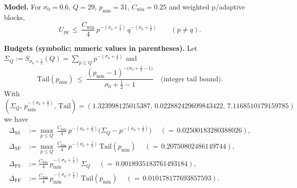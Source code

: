 \begingroup
\def\sigmao{0.6}
\def\Q{29}
\def\pmin{31}
\def\Cwin{0.25}

\def\SsigzeroQ{2.9593220929397814}          %
\def\SsigQ{1.323998125015387}               %
\def\pminpow{0.022882429699843422}          %
\def\TailInt{7.1168510179159785}            %

\def\Lofpmin{0.17500145020235344}           %
\def\mufar{0.9708330916329411}              %

\def\musmall{0.959149}                      %

\noindent\textbf{Model.}\quad
For $\sigma_0=\sigmao$, $Q=\Q$, $p_{\min}=\pmin$, $C_{\mathrm{win}}=\Cwin$ and weighted p\-/adaptive blocks,
\[
U_{pq}\ \le\ \frac{C_{\mathrm{win}}}{4}\,p^{-(\sigma_0+\tfrac12)}\,q^{-(\sigma_0+\tfrac12)}\qquad(p\neq q).
\]

\medskip
\noindent\textbf{Budgets (symbolic; numeric values in parentheses).}
Let $\Sigma_Q:=S_{\sigma_0+\frac12}(Q)=\sum_{p\le Q}p^{-(\sigma_0+\frac12)}$ and
\[
\mathrm{Tail}(p_{\min})
\ \le\
\frac{(p_{\min}-1)^{-\big(\sigma_0+\frac12-1\big)}}{\sigma_0+\frac12-1}
\quad\text{(integer tail bound)}.
\]
With $(\Sigma_Q,\,p_{\min}^{-(\sigma_0+\frac12)},\,\mathrm{Tail})=(\SsigQ,\,\pminpow,\,\TailInt)$ we have
\[
\begin{aligned}
\Delta_{\mathrm{SS}}
&:= \max_{p\le Q}\ \frac{C_{\mathrm{win}}}{4}\,p^{-(\sigma_0+\tfrac12)}
\Big(\Sigma_Q - p^{-(\sigma_0+\tfrac12)}\Big)
\quad\ (=\,\mathbf{0.02500183280388026}),\\[2pt]
\Delta_{\mathrm{SF}}
&:= \max_{p\le Q}\ \frac{C_{\mathrm{win}}}{4}\,p^{-(\sigma_0+\tfrac12)}\,
\mathrm{Tail}(p_{\min})
\quad\ (=\,\mathbf{0.20750802486149744}),\\[2pt]
\Delta_{\mathrm{FS}}
&:= \frac{C_{\mathrm{win}}}{4}\,p_{\min}^{-(\sigma_0+\tfrac12)}\,\Sigma_Q
\quad\ (=\,\mathbf{0.0018935183761493184}),\\[2pt]
\Delta_{\mathrm{FF}}
&:= \frac{C_{\mathrm{win}}}{4}\,p_{\min}^{-(\sigma_0+\tfrac12)}\,
\mathrm{Tail}(p_{\min})
\quad\ (=\,\mathbf{0.010178177693857593}).
\end{aligned}
\]

